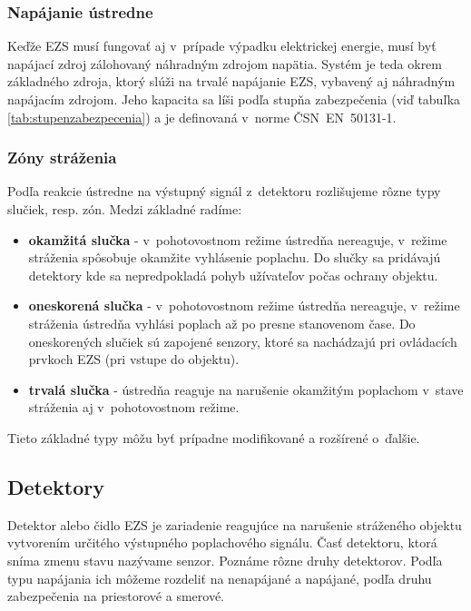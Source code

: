 \subsubsection{Napájanie ústredne}

Keďže EZS musí fungovať aj v~prípade výpadku elektrickej energie, musí byť napájací zdroj zálohovaný náhradným zdrojom napätia. Systém je teda okrem základného zdroja, ktorý slúži na trvalé napájanie EZS, vybavený aj náhradným napájacím zdrojom. Jeho kapacita sa líši podľa stupňa zabezpečenia (viď tabuľka \ref{tab:stupenzabezpecenia}) a je definovaná v~norme ČSN~EN~50131-1.

\subsubsection{Zóny stráženia}

Podľa reakcie ústredne na výstupný signál z~detektoru rozlišujeme rôzne typy slučiek, resp. zón. Medzi základné radíme:
\begin{itemize}
    \item \textbf{okamžitá slučka} - v~pohotovostnom režime ústredňa nereaguje, v~režime stráženia spôsobuje okamžite vyhlásenie poplachu. Do slučky sa pridávajú detektory kde sa nepredpokladá pohyb užívateľov počas ochrany objektu.
    \item \textbf{oneskorená slučka} - v~pohotovostnom režime ústredňa nereaguje, v~režime stráženia ústredňa vyhlási poplach až po presne stanovenom čase. Do oneskorených slučiek sú zapojené senzory, ktoré sa nachádzajú pri ovládacích prvkoch EZS (pri vstupe do objektu).
    \item \textbf{trvalá slučka} - ústredňa reaguje na narušenie okamžitým poplachom v~stave stráženia aj v~pohotovostnom režime.
\end{itemize}
Tieto základné typy môžu byť prípadne modifikované a rozšírené o~ďalšie.\cite{velas_ezs}

\subsection{Detektory}

Detektor alebo čidlo EZS je zariadenie reagujúce na narušenie stráženého objektu vytvorením určitého výstupného poplachového signálu. Časť detektoru, ktorá sníma zmenu stavu nazývame senzor. Poznáme rôzne druhy detektorov. Podľa typu napájania ich môžeme rozdeliť na nenapájané a napájané, podľa druhu zabezpečenia na priestorové a smerové.

